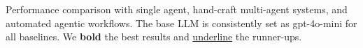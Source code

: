 \usepackage{xcolor}
\newcommand{\omark}{\text{\ding{108}}}
\newcommand{\greencheck}{{\color{ForestGreen}\ding{52}}}
\newcommand{\yellowcheck}{{\color{myyellow}\ding{52}}}
\newcommand{\redcheck}{{\color{red}\ding{55}}}
\usepackage[table,xcdraw,usenames,dvipsnames]{xcolor}
\newcommand{\blue}[1]{$_{\color{BlueGreen}\downarrow #1}$}
\newcommand{\red}[1]{$_{\color{RedOrange}\uparrow #1}$}
\usepackage{multirow}
\usepackage{makecell}
\usepackage{enumerate}
\usepackage{enumitem}
\usepackage{pifont}

\begin{table}[!t]
\centering
\caption{Performance comparison with single agent, hand-craft multi-agent systems, and automated agentic workflows. The base LLM is consistently set as gpt-4o-mini for all baselines. We \textbf{bold} the best results and \underline{underline} the runner-ups.}
\label{tab:rq1_performance}
\renewcommand\tabcolsep{8pt}
\renewcommand\arraystretch{1.1}


\end{table}
